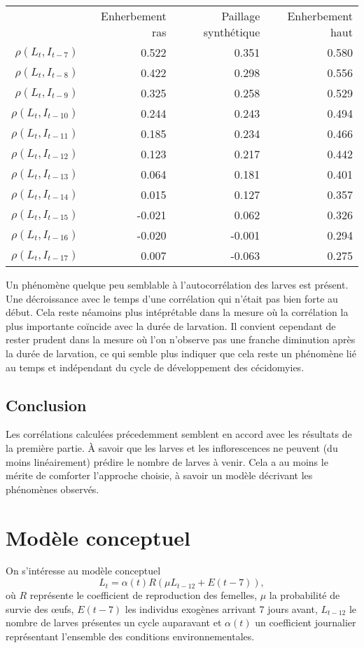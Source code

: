 \documentclass[a4paper, 11pt]{article}
\begin{document}
\begin{center}
\begin{tabular}{rrrr}
 & Enherbement ras & Paillage synthétique & Enherbement haut \\
$\rho\left( L_t, I_{t-7} \right)    $ & 0.522& 0.351& 0.580 \\
$\rho\left( L_t, I_{t-8} \right)    $ & 0.422& 0.298& 0.556  \\
$\rho\left( L_t, I_{t-9} \right)    $ & 0.325& 0.258& 0.529   \\
$\rho\left( L_t, I_{t-10} \right)    $& 0.244& 0.243& 0.494    \\
$\rho\left( L_t, I_{t-11} \right)    $& 0.185& 0.234& 0.466     \\
$\rho\left( L_t, I_{t-12} \right)    $& 0.123& 0.217& 0.442      \\
$\rho\left( L_t, I_{t-13} \right)    $& 0.064& 0.181& 0.401       \\
$\rho\left( L_t, I_{t-14} \right)    $& 0.015& 0.127& 0.357      \\
$\rho\left( L_t, I_{t-15} \right)    $& -0.021&  0.062&  0.326    \\
$\rho\left( L_t, I_{t-16} \right)    $& -0.020& -0.001&  0.294  \\
$\rho\left( L_t, I_{t-17} \right)    $&  0.007& -0.063& 0.275
\end{tabular}
\end{center}


Un phénomène quelque peu semblable à l'autocorrélation des larves est présent. Une décroissance avec le temps d'une corrélation qui n'était pas bien forte au début. Cela reste néamoins plus intéprétable dans la mesure où la corrélation la plus importante coïncide avec la durée de larvation. Il convient cependant de rester prudent dans la mesure où l'on n'observe pas une franche diminution après la durée de larvation, ce qui semble plus indiquer que cela reste un phénomène lié au temps et indépendant du cycle de développement des cécidomyies.


\subsection{Conclusion}

Les corrélations calculées précedemment semblent en accord avec les résultats de la première partie. À savoir que les larves et les inflorescences ne peuvent (du moins linéairement) prédire le nombre de larves à venir. Cela a au moins le mérite de comforter l'approche choisie, à savoir un modèle décrivant les phénomènes observés.

\section{Modèle conceptuel}

On s'intéresse au modèle conceptuel
$$L_t = \alpha(t) R \left( \mu L_{t-12} + E(t-7) \right),$$
où $R$ représente le coefficient de reproduction des femelles, $\mu$ la probabilité de survie des œufs, $E(t-7)$ les individus exogènes arrivant 7 jours avant, $L_{t-12}$ le nombre de larves présentes un cycle auparavant et $\alpha(t)$ un coefficient journalier représentant l'ensemble des conditions environnementales.
\end{document}
